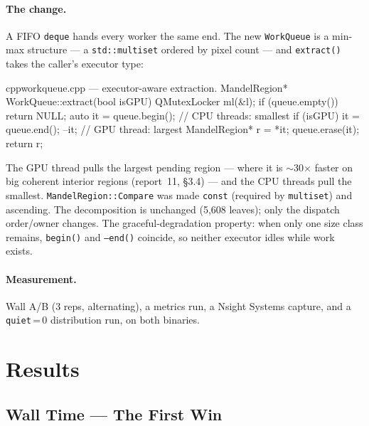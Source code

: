 \documentclass[
	english,
	letterpaper, oneside
]{article}
\begin{document}
\paragraph{The change.} A FIFO \texttt{deque} hands every worker the same end.
The new \texttt{WorkQueue} is a min-max structure --- a \texttt{std::multiset}
ordered by pixel count --- and \texttt{extract()} takes the caller's executor
type:

\begin{sourcecode}{cpp}{workqueue.cpp --- executor-aware extraction.}
MandelRegion* WorkQueue::extract(bool isGPU) {
  QMutexLocker ml(&l);
  if (queue.empty()) return NULL;
  auto it = queue.begin();        // CPU threads: smallest
  if (isGPU) { it = queue.end(); --it; }   // GPU thread: largest
  MandelRegion* r = *it; queue.erase(it); return r;
}
\end{sourcecode}

The GPU thread pulls the largest pending region --- where it is $\sim$30$\times$
faster on big coherent interior regions (report~11, §3.4) --- and the CPU threads
pull the smallest. \texttt{MandelRegion::Compare} was made \texttt{const}
(required by \texttt{multiset}) and ascending. The decomposition is unchanged
(5{,}608 leaves); only the dispatch order/owner changes. The graceful-degradation
property: when only one size class remains, \texttt{begin()} and
\texttt{--end()} coincide, so neither executor idles while work exists.

\paragraph{Measurement.} Wall A/B (3 reps, alternating), a metrics run, a Nsight
Systems capture, and a \texttt{quiet}\,=\,0 distribution run, on both binaries.

\section{Results}

\subsection{Wall Time --- The First Win}
\end{document}

